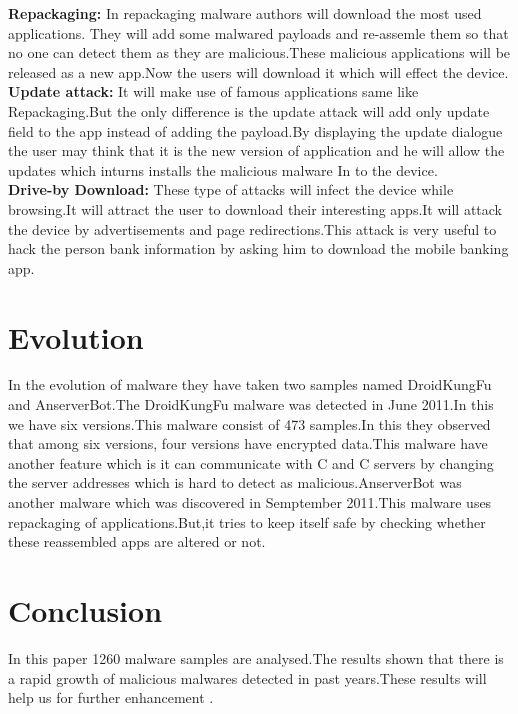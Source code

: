 \documentclass[10pt]{article}
\begin{document}
\textbf{Repackaging:}
      In repackaging malware authors will download the most used applications. They will add some malwared payloads and re-assemle them so that no one can detect them as they are malicious.These malicious applications will be released as a new app.Now the users will download it which will effect the device. \\
      
\textbf{Update attack:}
      It will make use of famous applications same like Repackaging.But the only difference is the update attack will add only update field to the app instead of adding the payload.By displaying the update dialogue the user may think that it is the new version of application and he will allow the updates which inturns installs the malicious malware In to the device.\\
      
\textbf{Drive-by Download:}
     These type of attacks will infect the device while browsing.It will attract the user to download their interesting apps.It will attack the device by advertisements and page redirections.This attack is very useful  to hack the person bank information by asking him to download the mobile banking app.



\section{Evolution} 
      In the evolution of malware they have taken two samples named DroidKungFu and AnserverBot.The DroidKungFu malware was detected in June 2011.In this we have six versions.This malware consist of 473 samples.In this they observed that among six versions, four versions have encrypted data.This malware have another feature which is it can communicate with C and C servers by changing the server addresses which is hard to detect as malicious.AnserverBot was another malware which was discovered in Semptember 2011.This malware uses repackaging of applications.But,it tries to keep itself safe by checking whether these reassembled apps are altered or not.
\section{Conclusion}
     In this paper 1260 malware samples are analysed.The results shown that there is a rapid growth of malicious malwares detected in past years.These results will help us for further enhancement .
\end{document}
